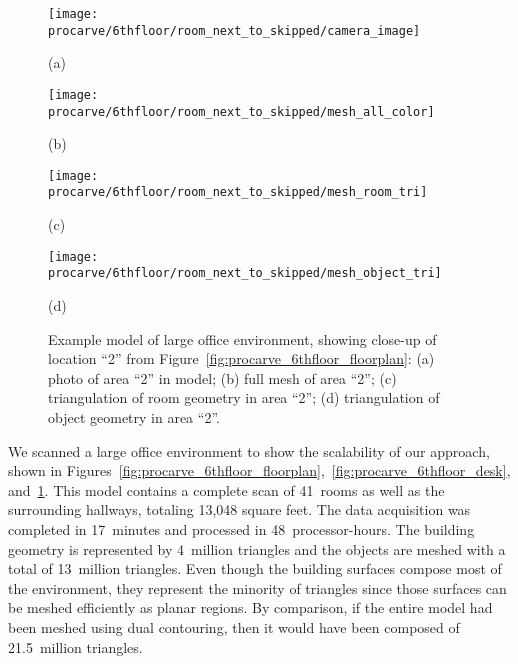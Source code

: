 \documentclass[12pt,onecolumn,oneside]{book}
\begin{document}
\begin{figure}[t]
	\begin{minipage}[t]{0.45\linewidth}
		\centerline{\texttt{[image: procarve/6thfloor/room\_next\_to\_skipped/camera\_image]}}
		\centerline{(a)}
	\end{minipage}
	\hfill
	\begin{minipage}[t]{0.45\linewidth}
		\centerline{\texttt{[image: procarve/6thfloor/room\_next\_to\_skipped/mesh\_all\_color]}}
		\centerline{(b)}
	\end{minipage}
	\hfill
	\begin{minipage}[t]{0.45\linewidth}
		\centerline{\texttt{[image: procarve/6thfloor/room\_next\_to\_skipped/mesh\_room\_tri]}}
		\centerline{(c)}
	\end{minipage}
	\hfill
	\begin{minipage}[t]{0.45\linewidth}
		\centerline{\texttt{[image: procarve/6thfloor/room\_next\_to\_skipped/mesh\_object\_tri]}}
		\centerline{(d)}
	\end{minipage}	

	\caption[Example model of large office environment, showing close-up of room.]{Example model of large office environment, showing close-up of location ``2'' from Figure~\ref{fig:procarve_6thfloor_floorplan}:  (a) photo of area ``2'' in model; (b) full mesh of area ``2''; (c) triangulation of room geometry in area ``2''; (d) triangulation of object geometry in area ``2''.}
	\label{fig:procarve_6thfloor_room}
\end{figure}

We scanned a large office environment to show the scalability of our approach, shown in Figures~\ref{fig:procarve_6thfloor_floorplan},~\ref{fig:procarve_6thfloor_desk}, and~\ref{fig:procarve_6thfloor_room}.  This model contains a complete scan of 41~rooms as well as the surrounding hallways, totaling 13,048 square feet.  The data acquisition was completed in 17~minutes and processed in 48~processor-hours.  The building geometry is represented by 4~million triangles and the objects are meshed with a total of 13~million triangles.  Even though the building surfaces compose most of the environment, they represent the minority of triangles since those surfaces can be meshed efficiently as planar regions.  By comparison, if the entire model had been meshed using dual contouring, then it would have been composed of 21.5~million triangles.
\end{document}
